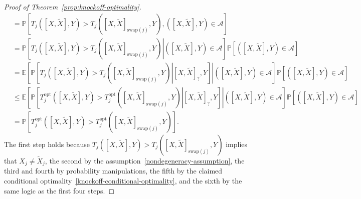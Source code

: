 \documentclass[12pt]{article}
\theoremstyle{definition}
\theoremstyle{remark}
\newcommand{\srx}{X}
\newcommand{\srxk}{\widetilde X}
\newcommand{\sry}{Y}
\begin{document}
\begin{proof}[Proof of Theorem~\ref{prop:knockoff-optimality}]
\begin{equation*}
\begin{split}
	&= \mathbb P[T_j([\srx, \srxk], \sry) > T_j([\srx, \srxk]_{\text{swap}(j)}, \sry), ([\srx, \srxk], \sry) \in \mathcal A] \\
	&= \mathbb P\left[\left.T_j([\srx, \srxk], \sry) > T_j([\srx, \srxk]_{\text{swap}(j)}, \sry)\right| ([\srx, \srxk], \sry) \in \mathcal A\right]\mathbb P[([\srx, \srxk], \sry) \in \mathcal A] \\
	&= \mathbb E\left[\left.\mathbb P\left[\left.T_j([\srx, \srxk], \sry) > T_j([\srx, \srxk]_{\text{swap}(j)}, \sry)\right| [\srx, \srxk]_?, \sry\right]\right|([\srx, \srxk], \sry) \in \mathcal A\right]\mathbb P[([\srx, \srxk], \sry) \in \mathcal A] \\
	&\leq \mathbb E\left[\left.\mathbb P\left[\left.T^{\text{opt}}_j([\srx, \srxk], \sry) > T^{\text{opt}}_j([\srx, \srxk]_{\text{swap}(j)}, \sry)\right| [\srx, \srxk]_?, \sry\right]\right|([\srx, \srxk], \sry) \in \mathcal A\right]\mathbb P[([\srx, \srxk], \sry) \in \mathcal A] \\
	&=\mathbb P\left[T^{\text{opt}}_j([\srx, \srxk], \sry) > T^{\text{opt}}_j([\srx, \srxk]_{\text{swap}(j)}, \sry)\right].
	\end{split}
	\end{equation*}
	The first step holds because $T_j([\srx, \srxk], \sry) > T_j([\srx, \srxk]_{\text{swap}(j)}, \sry)$ implies that $\srx_j \neq \srxk_j$, the second by the assumption~\eqref{nondegeneracy-assumption}, the third and fourth by probability manipulations, the fifth by the claimed conditional optimality~\eqref{knockoff-conditional-optimality}, and the sixth by the same logic as the first four steps.
	

\end{proof}
\end{document}
